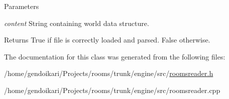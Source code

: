 \begin{DoxyParams}{Parameters}
\item[{\em content}]String containing world data structure. \end{DoxyParams}
\begin{DoxyReturn}{Returns}
True if file is correctly loaded and parsed. False otherwise. 
\end{DoxyReturn}


The documentation for this class was generated from the following files:\begin{DoxyCompactItemize}
\item 
/home/gendoikari/Projects/rooms/trunk/engine/src/\hyperlink{roomsreader_8h}{roomsreader.h}\item 
/home/gendoikari/Projects/rooms/trunk/engine/src/roomsreader.cpp\end{DoxyCompactItemize}
